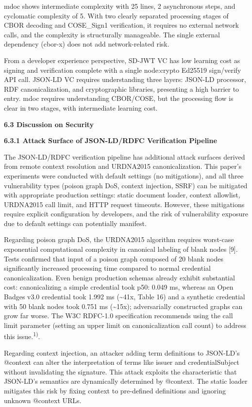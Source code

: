 mdoc shows intermediate complexity with 25 lines, 2 asynchronous steps, and cyclomatic complexity of 5. With two clearly separated processing stages of CBOR decoding and COSE\_Sign1 verification, it requires no external network calls, and the complexity is structurally manageable. The single external dependency (cbor-x) does not add network-related risk.

From a developer experience perspective, SD-JWT VC has low learning cost as signing and verification complete with a single node:crypto Ed25519 sign/verify API call. JSON-LD VC requires understanding three layers: JSON-LD processor, RDF canonicalization, and cryptographic libraries, presenting a high barrier to entry. mdoc requires understanding CBOR/COSE, but the processing flow is clear in two stages, with intermediate learning cost.

\textbf{6.3 Discussion on Security}

\textbf{6.3.1 Attack Surface of JSON-LD/RDFC Verification Pipeline}

The JSON-LD/RDFC verification pipeline has additional attack surfaces derived from remote context resolution and URDNA2015 canonicalization. This paper's experiments were conducted with default settings (no mitigations), and all three vulnerability types (poison graph DoS, context injection, SSRF) can be mitigated with appropriate production settings: static document loader, context allowlist, URDNA2015 call limit, and HTTP request timeouts. However, these mitigations require explicit configuration by developers, and the risk of vulnerability exposure due to default settings can potentially manifest.

Regarding poison graph DoS, the URDNA2015 algorithm requires worst-case exponential computational complexity in canonical labeling of blank nodes {[}9{]}. Tests confirmed that input of a poison graph composed of 20 blank nodes significantly increased processing time compared to normal credential canonicalization. Even benign production schemas already exhibit substantial cost: canonicalizing a simple credential took p50: 0.049 ms, whereas an Open Badges v3.0 credential took 1.992 ms (\textasciitilde41x, Table 16) and a synthetic credential with 50 blank nodes took 0.751 ms (\textasciitilde15x); adversarially constructed graphs can grow far worse. The W3C RDFC-1.0 specification recommends using the call limit parameter (setting an upper limit on canonicalization call count) to address this issue.\textsuperscript{1)}.

Regarding context injection, an attacker adding term definitions to JSON-LD's @context can alter the interpretation of terms like issuer and credentialSubject without invalidating the signature. This attack exploits the characteristic that JSON-LD's semantics are dynamically determined by @context. The static loader mitigates this risk by fixing context to pre-defined definitions and ignoring unknown @context URLs.

